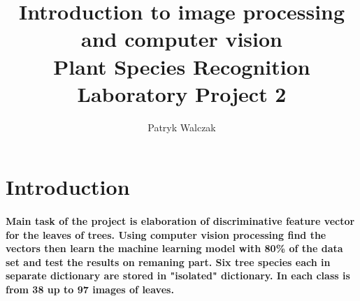 \documentclass[12pt]{article}
\title{
\large Introduction to image processing and computer vision \\
\LARGE \textbf{Plant Species Recognition} \\
Laboratory Project 2
}
\author{Patryk Walczak}
\begin{document}
\maketitle

\tableofcontents

\thispagestyle{empty}

\newpage

\clearpage
{}

\section{Introduction}

\paragraph{
Main task of the project is elaboration of discriminative feature vector for the leaves of trees. Using computer vision processing find the vectors then learn the machine learning model with 80\% of the data set and test the results on remaning part. Six tree species each in separate dictionary are stored in "isolated" dictionary. In each class is from 38 up to 97 images of leaves.
}
\end{document}
